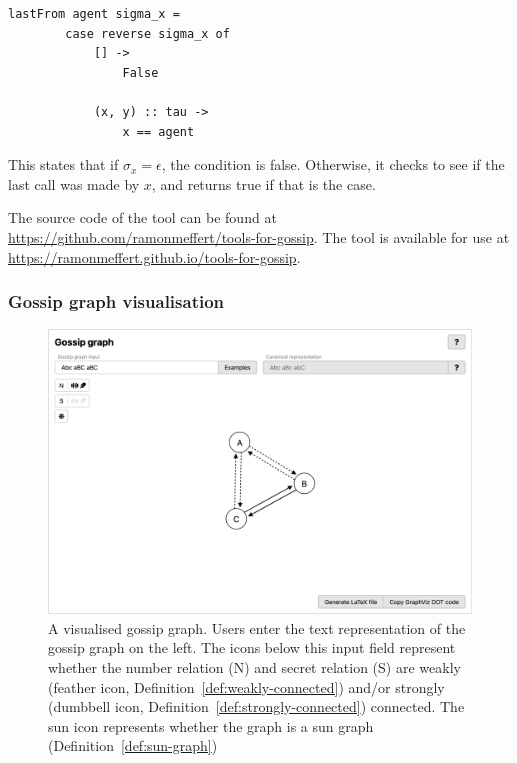 \begin{lstlisting}[caption={\(\sigma_x = \tau \conc xy\) in Elm.}, label=lst:elm-ex-1]
    lastFrom agent sigma_x = 
        case reverse sigma_x of
            [] ->
                False

            (x, y) :: tau ->
                x == agent
\end{lstlisting}

This states that if \(\sigma_x = \epsilon\), the condition is false. 
Otherwise, it checks to see if the last call was made by \(x\), and returns true if that is the case.

The source code of the tool can be found at \url{https://github.com/ramonmeffert/tools-for-gossip}.
The tool is available for use at \url{https://ramonmeffert.github.io/tools-for-gossip}.

\subsubsection{Gossip graph visualisation}\label{sec:gossip-graph-visualisation}

\begin{figure}[htb!]
    \includegraphics[width=\linewidth]{img/gossip-graph.png}
    \caption{A visualised gossip graph. Users enter the text representation of the gossip graph on the left. The icons below this input field represent whether the number relation (N) and secret relation (S) are weakly (feather icon, Definition~\ref{def:weakly-connected}) and/or  strongly (dumbbell icon, Definition~\ref{def:strongly-connected}) connected. The sun icon represents whether the graph is a sun graph (Definition~\ref{def:sun-graph})}
    \label{fig:gossip-graph}
\end{figure}

